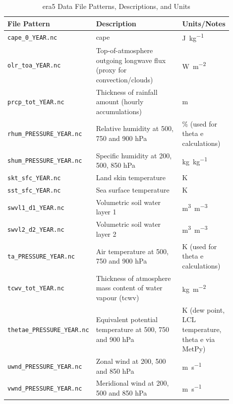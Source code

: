 \begin{table}[ht]
    \centering
    \caption{\acrshort{era5} Data File Patterns, Descriptions, and Units}
    \label{tab:era5-file-patterns}
    \begin{tabular}{p{0.28\linewidth} p{0.42\linewidth} p{0.2\linewidth}}
        \toprule
        File Pattern & Description & Units/Notes \\
        \midrule
        \texttt{cape\_0\_YEAR.nc} & \acrfull{cape} & \unit{\joule\per\kilogram} \\
        \texttt{olr\_toa\_YEAR.nc} & Top-of-atmosphere outgoing longwave flux (proxy for convection/clouds) & \unit{\watt\per\meter\squared} \\
        \texttt{prcp\_tot\_YEAR.nc} & Thickness of rainfall amount (hourly accumulations) & \unit{\meter} \\
        \texttt{rhum\_PRESSURE\_YEAR.nc} & Relative humidity at 500, 750 and 900 \unit{\hecto\pascal} & \unit{\percent} (used for theta e calculations) \\
        \texttt{shum\_PRESSURE\_YEAR.nc} & Specific humidity at 200, 500, 850 \unit{\hecto\pascal} & \unit{\kilogram\per\kilogram} \\
        \texttt{skt\_sfc\_YEAR.nc} & Land skin temperature & \unit{\kelvin} \\
        \texttt{sst\_sfc\_YEAR.nc} & Sea surface temperature & \unit{\kelvin} \\
        \texttt{swvl1\_d1\_YEAR.nc} & Volumetric soil water layer 1 & \unit{\meter\cubed\per\meter\cubed} \\
        \texttt{swvl2\_d2\_YEAR.nc} & Volumetric soil water layer 2 & \unit{\meter\cubed\per\meter\cubed} \\
        \texttt{ta\_PRESSURE\_YEAR.nc} & Air temperature at 500, 750 and 900 \unit{\hecto\pascal} & \unit{\kelvin} (used for theta e calculations) \\
        \texttt{tcwv\_tot\_YEAR.nc} & Thickness of atmosphere mass content of water vapour (\acrfull{tcwv}) & \unit{\kilogram\per\meter\squared} \\
        \texttt{thetae\_PRESSURE\_YEAR.nc} & Equivalent potential temperature at 500, 750 and 900 \unit{\hecto\pascal} & \unit{\kelvin} (dew point, LCL temperature, theta e via MetPy) \\
        \texttt{uwnd\_PRESSURE\_YEAR.nc} & Zonal wind at 200, 500 and 850 \unit{\hecto\pascal} & \unit{\meter\per\second} \\
        \texttt{vwnd\_PRESSURE\_YEAR.nc} & Meridional wind at 200, 500 and 850 \unit{\hecto\pascal} & \unit{\meter\per\second} \\
        \bottomrule
    \end{tabular}
\end{table}


